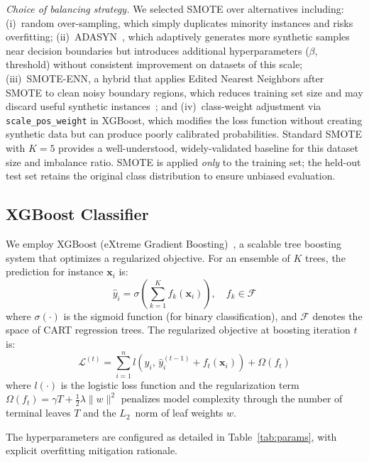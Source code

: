 \documentclass[10pt, conference, letterpaper]{IEEEtran}
\begin{document}
\textit{Choice of balancing strategy.} We selected SMOTE over alternatives including: (i)~random over-sampling, which simply duplicates minority instances and risks overfitting; (ii)~ADASYN~\cite{he2008adasyn}, which adaptively generates more synthetic samples near decision boundaries but introduces additional hyperparameters ($\beta$, threshold) without consistent improvement on datasets of this scale; (iii)~SMOTE-ENN, a hybrid that applies Edited Nearest Neighbors after SMOTE to clean noisy boundary regions, which reduces training set size and may discard useful synthetic instances~\cite{he2009imbalanced}; and (iv)~class-weight adjustment via \texttt{scale\_pos\_weight} in XGBoost, which modifies the loss function without creating synthetic data but can produce poorly calibrated probabilities. Standard SMOTE with $K{=}5$ provides a well-understood, widely-validated baseline for this dataset size and imbalance ratio. SMOTE is applied \textit{only} to the training set; the held-out test set retains the original class distribution to ensure unbiased evaluation.

\subsection{XGBoost Classifier}
\label{subsec:xgboost}

We employ XGBoost (eXtreme Gradient Boosting)~\cite{chen2016xgboost}, a scalable tree boosting system that optimizes a regularized objective. For an ensemble of $K$ trees, the prediction for instance $\mathbf{x}_i$ is:
\begin{equation}
\hat{y}_i = \sigma\!\left(\sum_{k=1}^{K} f_k(\mathbf{x}_i)\right), \quad f_k \in \mathcal{F}
\label{eq:xgboost_pred}
\end{equation}
where $\sigma(\cdot)$ is the sigmoid function (for binary classification), and $\mathcal{F}$ denotes the space of CART regression trees. The regularized objective at boosting iteration $t$ is:
\begin{equation}
\mathcal{L}^{(t)} = \sum_{i=1}^{n} l\!\left(y_i,\, \hat{y}_i^{(t-1)} + f_t(\mathbf{x}_i)\right) + \Omega(f_t)
\label{eq:xgboost_obj}
\end{equation}
where $l(\cdot)$ is the logistic loss function and the regularization term $\Omega(f_t) = \gamma T + \frac{1}{2}\lambda\|w\|^2$ penalizes model complexity through the number of terminal leaves $T$ and the $L_2$~norm of leaf weights $w$.

The hyperparameters are configured as detailed in Table~\ref{tab:params}, with explicit overfitting mitigation rationale.
\end{document}
